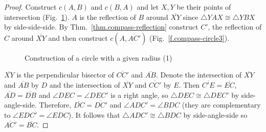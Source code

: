 \begin{proof}
Construct $c(A,B)$ and $c(B,A)$ and let $X,Y$ be their points of intersection (Fig.~\ref{f.compass-circle1}). $A$ is the reflection of $B$ around $\overline{XY}$ since $\triangle YAX\cong \triangle YBX$ by side-side-side. By Thm.~\ref{thm.compass-reflection} construct $C'$, the reflection of $C$ around $\overline{XY}$ and then construct $c(A,\overline{AC'})$ (Fig.~\ref{f.compass-circle3}).

\begin{figure}[b]
\begin{center}
\end{center}
\caption{Construction of  a circle with a given radius (1)}\label{f.compass-circle1}
\end{figure}

$\overline{XY}$ is the perpendicular bisector of $\overline{CC'}$ and $\overline{AB}$. Denote the intersection of $\overline{XY}$ and $\overline{AB}$ by $D$ and the intersection of $\overline{XY}$ and $\overline{CC'}$ by $E$. Then $\overline{C'E}=\overline{EC}$, $\overline{AD}=\overline{DB}$ and $\angle DEC=\angle DEC'$ is a right angle, so $\triangle DEC\cong\triangle DEC'$ by side-angle-side. Therefore, $\overline{DC}=\overline{DC'}$ and $\angle ADC'=\angle BDC$ (they are complementary to $\angle EDC'=\angle EDC$). It follows that $\triangle ADC'\cong\triangle BDC$ by side-angle-side so $\overline{AC'}=\overline{BC}$.
\end{proof}

